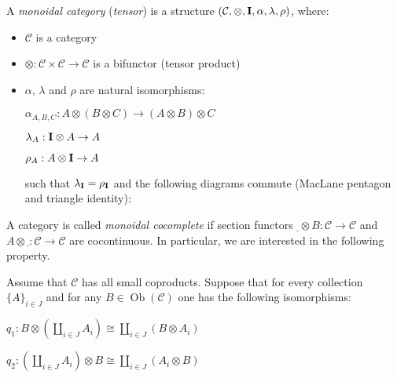 \documentclass[a4paper]{article}
\theoremstyle{defin}
\theoremstyle{theorem}
\theoremstyle{claim}
\theoremstyle{prop}
\theoremstyle{lemma}
\theoremstyle{fact}
\theoremstyle{ex}
\theoremstyle{col}
\begin{document}
A \emph{monoidal category} (\emph{tensor}) is a structure $(\mathcal{C}, \otimes, {\bf I}, \alpha, \lambda, \rho)$, where:
\begin{itemize}
\item $\mathcal{C}$ is a category
\item $\otimes : \mathcal{C} \times \mathcal{C} \to \mathcal{C}$ is a bifunctor (tensor product)
\item $\alpha$, $\lambda$ and $\rho$ are natural isomorphisms:

\begin{center}
$\alpha_{A,B,C} : A \otimes (B \otimes C) \to (A \otimes B) \otimes C$

$\lambda_A : {\bf I} \otimes A \to A$

$\rho_A : A \otimes {\bf I} \to A$
\end{center}

such that $\lambda_{\bf I} = \rho_{\bf I}$ and the following diagrams commute (MacLane pentagon and triangle identity):

\vspace{\baselineskip}

\centerline{
}

\centerline{
}
\end{itemize}

A category is called \emph{monoidal cocomplete} if section functors $\underline{ } \otimes B : \mathcal{C} \to \mathcal{C}$ and $A \otimes \underline{ }: \mathcal{C} \to \mathcal{C}$ are cocontinuous. In particular, we are interested in the following property.

Assume that $\mathcal{C}$ has all small coproducts. Suppose that for every collection $\{ A \}_{i \in J}$ and for any $B \in \operatorname{Ob}(\mathcal{C})$ one has the following isomorphisms:
\begin{center}
$q_1 : B \otimes (\coprod \limits_{i \in J} A_i) \cong \coprod \limits_{i \in J} (B \otimes A_i)$

$q_2 : (\coprod \limits_{i \in J} A_i) \otimes B \cong \coprod \limits_{i \in J} (A_i \otimes B)$
\end{center}
\end{document}
